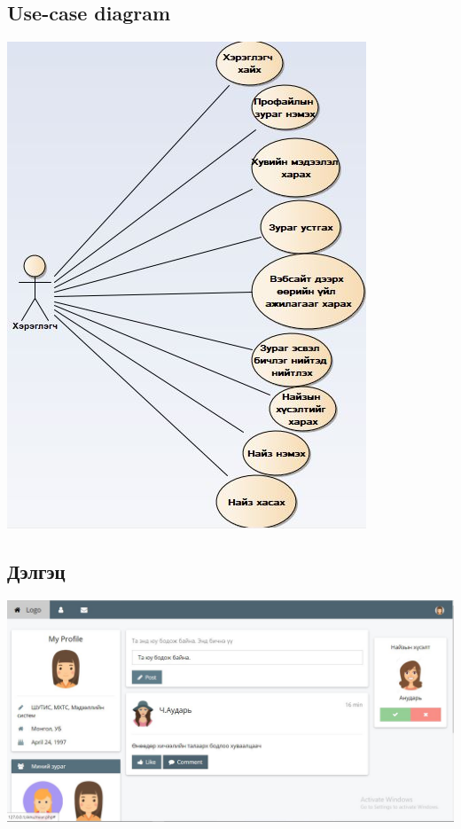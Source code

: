 \documentclass[]{article}
\begin{document}
\subsection{Use-case diagram}
\includegraphics[width=\textwidth]{usecaseZ}
\subsection{Дэлгэц}
\includegraphics[width=\textwidth]{delgets}
\end{document}
